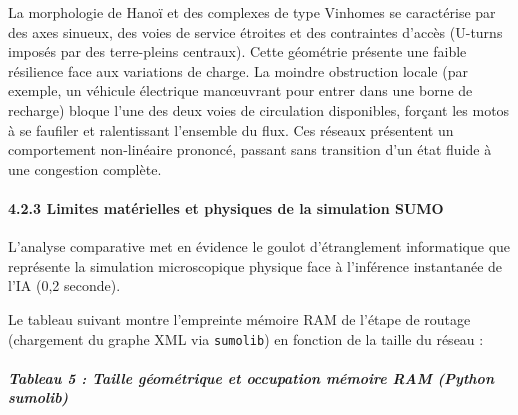 \documentclass[10pt, a4paper]{article}
\begin{document}
La morphologie de Hanoï et des complexes de type Vinhomes se caractérise
par des axes sinueux, des voies de service étroites et des contraintes
d'accès (U-turns imposés par des terre-pleins centraux). Cette géométrie
présente une faible résilience face aux variations de charge. La moindre
obstruction locale (par exemple, un véhicule électrique manœuvrant pour
entrer dans une borne de recharge) bloque l'une des deux voies de
circulation disponibles, forçant les motos à se faufiler et ralentissant
l'ensemble du flux. Ces réseaux présentent un comportement non-linéaire
prononcé, passant sans transition d'un état fluide à une congestion
complète.

\paragraph{4.2.3 Limites matérielles et physiques de la simulation
SUMO}\label{limites-matuxe9rielles-et-physiques-de-la-simulation-sumo}

L'analyse comparative met en évidence le goulot d'étranglement
informatique que représente la simulation microscopique physique face à
l'inférence instantanée de l'IA (0,2 seconde).

Le tableau suivant montre l'empreinte mémoire RAM de l'étape de routage
(chargement du graphe XML via \texttt{sumolib}) en fonction de la taille
du réseau :

\subparagraph{Tableau 5 : Taille géométrique et occupation mémoire RAM
(Python
sumolib)}\label{tableau-5-taille-guxe9omuxe9trique-et-occupation-muxe9moire-ram-python-sumolib}
\end{document}
